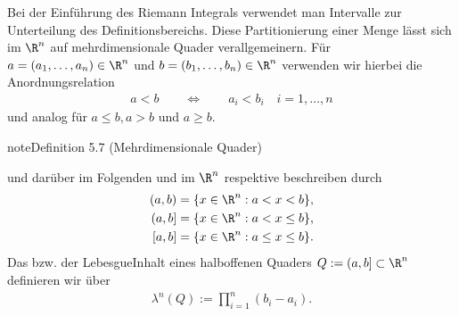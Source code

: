 \documentclass[letterpaper,10pt,english]{jupyterBook}
\begin{document}
\sphinxAtStartPar
Bei der Einführung des Riemann Integrals verwendet man Intervalle zur Unterteilung des Definitionsbereichs.
Diese Partitionierung einer Menge lässt sich im \(\R^n\) auf mehrdimensionale Quader verallgemeinern. Für \(a = (a_1,\ldots,a_n) \in \R^n\) und \(b = (b_1,\ldots,b_n) \in \R^n\) verwenden wir hierbei die Anordnungsrelation
\begin{equation*}
\begin{split}a < b \qquad \Leftrightarrow \qquad a_i < b_i \quad i=1,\ldots,n\end{split}
\end{equation*}
\sphinxAtStartPar
und analog für \(a \leq b, a > b\) und \(a \geq b\).
\label{masstheorie/masstheorie:def:quader}
\begin{sphinxadmonition}{note}{Definition 5.7 (Mehrdimensionale Quader)}



\sphinxAtStartPar
und darüber im Folgenden  und  im \(\R^n\) respektive beschreiben durch
\begin{equation*}
\begin{split}(a,b) &= \lbrace x \in \R^n : a < x < b \rbrace,\\
(a,b] &= \lbrace x \in \R^n : a < x \leq b \rbrace,\\
[a,b] &= \lbrace x \in \R^n : a \leq x \leq b \rbrace.\end{split}
\end{equation*}
\sphinxAtStartPar
Das  bzw. der Lebesgue\sphinxhyphen{}Inhalt eines halboffenen Quaders \(Q := (a,b] \subset \R^n\) definieren wir über
\begin{equation*}
\begin{split}\lambda^n(Q) := \prod_{i=1}^n (b_i - a_i).\end{split}
\end{equation*}\end{sphinxadmonition}
\end{document}
